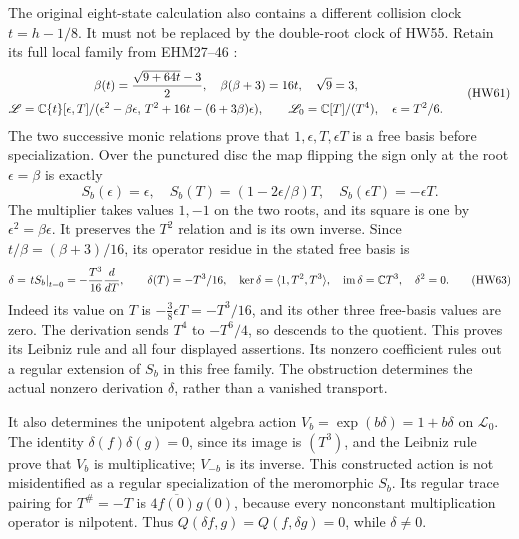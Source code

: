 The original eight-state calculation also contains a different
collision clock \(t=h-1/8\). It must not be replaced by the
double-root clock of HW55. Retain its full local family
from EHM27--46 \cite{HW-EHM}:
\[
 \begin{gathered}
 \beta(t)=\frac{\sqrt{9+64t}-3}{2},\quad
 \beta(\beta+3)=16t,\quad \sqrt{9}=3,\\
 \mathscr L=
 \mathbb C\{t\}[\epsilon,T]/
       (\epsilon^2-\beta\epsilon,\,
          T^2+16t-(6+3\beta)\epsilon),\qquad
 \mathscr L_0=\mathbb C[T]/(T^4),\quad \epsilon=T^2/6 .
 \end{gathered}
 \tag{HW61}
\]
The two successive monic relations prove that
\(1,\epsilon,T,\epsilon T\) is a free basis before
specialization. Over the punctured disc the map flipping
the sign only at the root \(\epsilon=\beta\) is exactly
\[
 S_b(\epsilon)=\epsilon,\quad
 S_b(T)=(1-2\epsilon/\beta)T,\quad
 S_b(\epsilon T)=-\epsilon T.
 \tag{HW62}
\]
The multiplier takes values \(1,-1\) on the two roots,
and its square is one by \(\epsilon^2=\beta\epsilon\).
It preserves the \(T^2\) relation and is its own inverse.
Since \(t/\beta=(\beta+3)/16\), its operator residue
in the stated free basis is
\[
 \delta=\left.tS_b\right|_{t=0}
     =-\frac{T^3}{16}\frac{d}{dT},\qquad
 \delta(T)=-T^3/16,\quad
 \ker\delta=\langle1,T^2,T^3\rangle,\quad
 \operatorname{im}\delta=\mathbb C T^3,\quad \delta^2=0.
 \tag{HW63}
\]
Indeed its value on \(T\) is
\(-\frac38\epsilon T=-T^3/16\), and its other three
free-basis values are zero. The derivation sends \(T^4\)
to \(-T^6/4\), so descends to the quotient. This proves
its Leibniz rule and all four displayed assertions.
Its nonzero coefficient rules out a regular extension
of \(S_b\) in this free family. The obstruction determines
the actual nonzero derivation \(\delta\), rather than a
vanished transport.

It also determines the unipotent algebra action
\(V_b=\exp(b\delta)=1+b\delta\) on \(\mathscr L_0\).
The identity
\(\delta(f)\delta(g)=0\), since its image is \((T^3)\),
and the Leibniz rule prove that \(V_b\) is multiplicative;
\(V_{-b}\) is its inverse. This constructed action is not
misidentified as a regular specialization of the
meromorphic \(S_b\).
Its regular trace pairing for \(T^\#=-T\) is
\(4\overline{f(0)}g(0)\), because every nonconstant
multiplication operator is nilpotent. Thus
\(Q(\delta f,g)=Q(f,\delta g)=0\), while \(\delta\ne0\).

